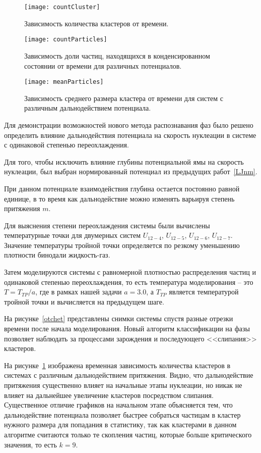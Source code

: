 \begin{figure}[!t]
    \centering
    \texttt{[image: countCluster]}
    \caption{Зависимость количества кластеров от времени.}
    \label{countCluster}
\end{figure}

\begin{figure}[!t]
    \centering
    \texttt{[image: countParticles]}
    \caption{Зависимость доли частиц, находящихся в конденсированном состоянии от времени для различных потенциалов.}
    \label{countParticles}
\end{figure}

\begin{figure}[!t]
    \centering
    \texttt{[image: meanParticles]}
    \caption{Зависимость среднего размера кластера от времени для систем с различным дальнодействием потенциала.}
    \label{meanParticles}
\end{figure}

Для демонстрации возможностей нового метода распознавания фаз было решено определить влияние дальнодействия потенциала на скорость нуклеации в системе с одинаковой степенью переохлаждения.

Для того, чтобы исключить влияние глубины потенциальной ямы на скорость нуклеации, был выбран нормированный потенциал из предыдущих работ~\ref{LJnm}.

При данном потенциале взаимодействия глубина остается постоянно равной единице, в то время как дальнодействие можно изменять варьируя степень притяжения $m$.

Для выяснения степени переохлаждения системы были вычислены температурные точки для двумерных систем $U_{12-4}$, $U_{12-5}$, $U_{12-6}$, $U_{12-7}$.
Значение температуры тройной точки определяется по резкому уменьшению плотности бинодали жидкость-газ.

Затем моделируются системы с равномерной плотностью распределения частиц и одинаковой степенью переохлаждения, то есть температура моделирования -- это $T = T_{TP} / a$, где в рамках нашей задачи $a = 3.0$, а $T_{TP}$ является температурой тройной точки и вычисляется на предыдущем шаге.

На рисунке~\ref{otchet} представлены снимки системы спустя разные отрезки времени после начала моделирования.
Новый алгоритм классификации на фазы позволяет наблюдать за процессами зарождения и последующего <<слипания>> кластеров.


На рисунке~\ref{countCluster} изображена временная зависимость количества кластеров в системах с различным дальнодействием притяжения. 
Видно, что дальнодействие притяжения существенно влияет на начальные этапы нуклеации, но никак не влияет на дальнейшее увеличение кластеров посредством слипания.
Существенное отличие графиков на начальном этапе объясняется тем, что дальнодействие потенциала позволяет быстрее собраться частицам в кластер нужного размера для попадания в статистику, так как кластерами в данном алгоритме считаются только те скопления частиц, которые больше критического значения, то есть $k = 9$.


